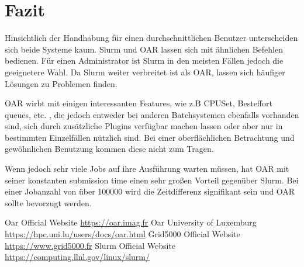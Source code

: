 \section{Fazit}
Hinsichtlich der Handhabung für einen durchschnittlichen Benutzer
unterscheiden sich beide Systeme kaum. Slurm und OAR lassen sich mit ähnlichen
Befehlen bedienen.
Für einen Administrator ist Slurm in den meisten Fällen jedoch 
die geeignetere Wahl.
Da Slurm weiter verbreitet ist als OAR, lassen sich häufiger 
Lösungen zu Problemen finden.

OAR wirbt mit einigen interessanten Features, wie z.B CPUSet, Besteffort queues, etc. , die
jedoch entweder bei anderen Batchsystemen ebenfalls vorhanden sind,
sich durch zusätzliche Plugins verfügbar machen lassen oder aber nur in bestimmten Einzelfällen nützlich sind.
Bei einer oberflächlichen Betrachtung und gewöhnlichen Benutzung kommen diese nicht zum Tragen.

Wenn jedoch sehr viele Jobs auf ihre Ausführung warten müssen, hat OAR mit seiner konstanten submission time einen 
sehr großen Vorteil gegenüber Slurm. Bei einer Jobanzahl von über 100000 wird die Zeitdifferenz signifikant sein und OAR sollte bevorzugt werden.



\begin{thebibliography}{999}
	    \bibitem [0] {} Oar Official Website \url{https://oar.imag.fr}
	    \bibitem [1] {} Oar University of Luxemburg \url{https://hpc.uni.lu/users/docs/oar.html}
	    \bibitem [2] {} Grid5000 Official Website \url{https://www.grid5000.fr}
	    \bibitem [3] {} Slurm Official Website \url{https://computing.llnl.gov/linux/slurm/}
	\newline
\end{thebibliography}
